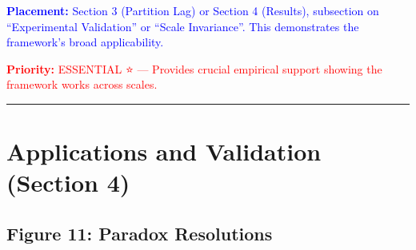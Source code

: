 \documentclass[11pt,letterpaper]{article}
\newcommand{\placement}[1]{\textcolor{blue}{\textbf{Placement:} #1}}
\newcommand{\priority}[1]{\textcolor{red}{\textbf{Priority:} #1}}
\begin{document}
\placement{Section 3 (Partition Lag) or Section 4 (Results), subsection on ``Experimental Validation'' or ``Scale Invariance''. This demonstrates the framework's broad applicability.}

\priority{ESSENTIAL ⭐ — Provides crucial empirical support showing the framework works across scales.}

\vspace{1cm}
\hrule
\vspace{1cm}

\section{Applications and Validation (Section 4)}

\subsection{Figure 11: Paradox Resolutions}
\end{document}
